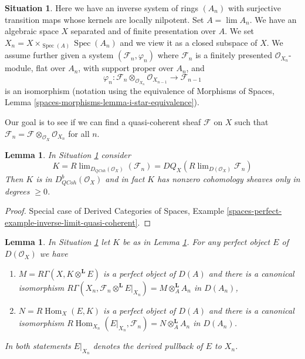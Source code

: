 \documentclass{stacks-project}
\theoremstyle{plain}
\newtheorem{lemma}[subsection]{Lemma}
\theoremstyle{definition}
\newtheorem{situation}[subsection]{Situation}
\theoremstyle{remark}
\numberwithin{equation}{subsection}
\def\lim{\mathop{\mathrm{lim}}\nolimits}
\def\Spec{\mathop{\mathrm{Spec}}}
\def\Hom{\mathop{\mathrm{Hom}}\nolimits}
\def\QCoh{\mathit{QCoh}}
\begin{document}
\begin{situation}
\label{situation-existence}
Here we have an inverse system of rings $(A_n)$ with surjective transition
maps whose kernels are locally nilpotent. Set $A = \lim A_n$. We have an
algebraic space $X$ separated and of finite presentation over $A$.
We set $X_n = X \times_{\Spec(A)} \Spec(A_n)$ and we
view it as a closed subspace of $X$. We assume further given a system
$(\mathcal{F}_n, \varphi_n)$ where $\mathcal{F}_n$ is a finitely presented
$\mathcal{O}_{X_n}$-module, flat over $A_n$, with support proper over $A_n$,
and
$$
\varphi_n :
\mathcal{F}_n \otimes_{\mathcal{O}_{X_n}} \mathcal{O}_{X_{n - 1}}
\longrightarrow
\mathcal{F}_{n - 1}
$$
is an isomorphism (notation using the equivalence of
Morphisms of Spaces, Lemma \ref{spaces-morphisms-lemma-i-star-equivalence}).
\end{situation}

\noindent
Our goal is to see if we can find a quasi-coherent sheaf $\mathcal{F}$
on $X$ such that
$\mathcal{F}_n = \mathcal{F} \otimes_{\mathcal{O}_X} \mathcal{O}_{X_n}$
for all $n$.

\begin{lemma}
\label{lemma-compute-what-it-should-be}
In Situation \ref{situation-existence} consider
$$
K = R\lim_{D_\QCoh(\mathcal{O}_X)}(\mathcal{F}_n) =
DQ_X(R\lim_{D(\mathcal{O}_X)}\mathcal{F}_n)
$$
Then $K$ is in $D^b_{\QCoh}(\mathcal{O}_X)$ and in fact
$K$ has nonzero cohomology sheaves only in degrees $\geq 0$.
\end{lemma}

\begin{proof}
Special case of
Derived Categories of Spaces, Example
\ref{spaces-perfect-example-inverse-limit-quasi-coherent}.
\end{proof}

\begin{lemma}
\label{lemma-compute-against-perfect}
In Situation \ref{situation-existence} let $K$ be as in
Lemma \ref{lemma-compute-what-it-should-be}. For any perfect
object $E$ of $D(\mathcal{O}_X)$ we have
\begin{enumerate}
\item $M = R\Gamma(X, K \otimes^\mathbf{L} E)$ is a perfect object of $D(A)$
and there is a canonical isomorphism
$R\Gamma(X_n, \mathcal{F}_n \otimes^\mathbf{L} E|_{X_n}) =
M \otimes_A^\mathbf{L} A_n$
in $D(A_n)$,
\item $N = R\Hom_X(E, K)$ is a perfect object of $D(A)$
and there is a canonical isomorphism
$R\Hom_{X_n}(E|_{X_n}, \mathcal{F}_n) = N \otimes_A^\mathbf{L} A_n$
in $D(A_n)$.
\end{enumerate}
In both statements $E|_{X_n}$ denotes the derived pullback
of $E$ to $X_n$.
\end{lemma}
\end{document}
